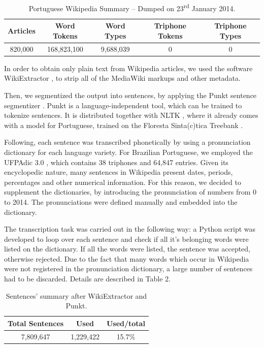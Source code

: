 \begin{table}[H]
\begin{center}
\begin{tabular}{|c|c|c|c|c|}
\hline \bf Articles & \bf Word Tokens  & \bf Word Types & \bf Triphone Tokens & \bf Triphone Types\\\hline
820,000 & 168,823,100 & 9,688,039 & 0 & 0\\
\hline
\end{tabular}
\end{center}
\caption{\label{wikipedia-summary} Portuguese Wikipedia Summary -- Dumped on 23\textsuperscript{rd} January 2014.}
\end{table}

In order to obtain only plain text from Wikipedia articles, we used the software WikiExtractor \cite{Wikiextractor2013}, to strip 
all of the MediaWiki markups and other metadata. 

Then, we segmentized the output into sentences, by applying the Punkt sentence segmentizer \cite{Kiss2006}. Punkt is a
language-independent tool, which can be trained to tokenize sentences. It is distributed together with NLTK \cite{NLTK2009}, where it 
already comes with a model for Portuguese, trained on the Floresta Sinta(c)tica Treebank \cite{Floresta2008}.

Following, each sentence was transcribed phonetically by using a pronunciation dictionary for each language variety. 
For Brazilian Portuguese, we employed the UFPAdic 3.0 \cite{Neto2011}, which contains 38 triphones and 64,847 entries. Given 
its encyclopedic nature, many sentences in Wikipedia present dates, periods, percentages and other numerical information. 
For this reason, we decided to supplement the dictionaries, by introducing the pronunciation of numbers from 0 to 2014. The
pronunciations were defined manually and embedded into the dictionary.

The transcription task was carried out in the following way: a Python script was developed to loop over each sentence 
and check if all it's belonging words were listed on the dictionary. If all the words were listed, the sentence was 
accepted, otherwise rejected. Due to the fact that many words which occur in Wikipedia were not registered in the 
pronunciation dictionary, a large number of sentences had to be discarded. Details are described in Table 2.

\begin{table}[H]
\begin{center}
\begin{tabular}{|c|c|c|}
\hline \bf Total Sentences & \bf Used & \bf Used/total\\ \hline
7,809,647 & 1,229,422 & 15.7\% \\
\hline
\end{tabular}
\end{center}
\caption{\label{wikipedia-used-discarded} Sentences' summary after WikiExtractor and Punkt.}
\end{table}


